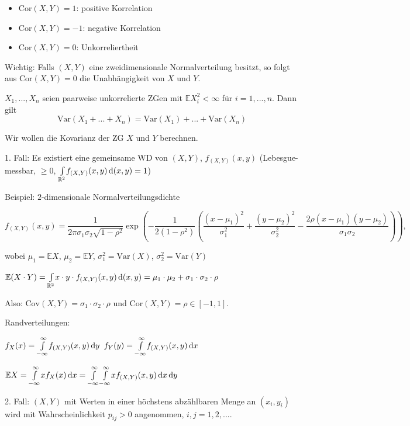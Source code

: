 \documentclass{cheat-sheet}
\newcommand{\E}{\mathbb{E}} %
\newcommand{\Var}{\mathrm{Var}} %
\newcommand{\Cov}{\mathrm{Cov}} %
\newcommand{\cor}{\mathrm{Cor}} %
\begin{document}
\begin{bem}
  \begin{itemize}
    \item $\cor(X, Y) = 1$: positive Korrelation
    \item $\cor(X, Y) = -1$: negative Korrelation
    \item $\cor(X, Y) = 0$: Unkorreliertheit
  \end{itemize}
\end{bem}

Wichtig: Falls $(X, Y)$ eine zweidimensionale Normalverteilung besitzt, so folgt aus $\cor(X, Y) = 0$ die Unabhängigkeit von $X$ und $Y$.

\begin{satz}
  $X_1, ..., X_n$ seien paarweise unkorrelierte ZGen mit $\E X_i^2 < \infty$ für $i = 1, ..., n$. Dann gilt
  \[ \Var(X_1 + ... + X_n) = \Var(X_1) + ... + \Var(X_n) \]
\end{satz}



Wir wollen die Kovarianz der ZG $X$ und $Y$ berechnen.

1. Fall: Es existiert eine gemeinsame WD von $(X, Y)$, $f_{(X, Y)}(x, y)$ (Lebesgue-messbar, $\geq 0$, ${\textstyle \int\limits_{\mathbb{R}^2}^{}} f_{(X,Y)}(x,y) \,\mathrm{d} (x, y) = 1$)

Beispiel: $2$-dimensionale Normalverteilungsdichte

\[ f_{(X,Y)}(x,y) = \frac{1}{2 \pi \sigma_1 \sigma_2 \sqrt{1 - \rho^2}} \exp \left( - \frac{1}{2 (1 - \rho^2)} \left( \frac{(x-\mu_1)^2}{\sigma_1^2} + \frac{(y-\mu_2)^2}{\sigma_2^2} - \frac{2 \rho (x-\mu_1)(y-\mu_2)}{\sigma_1 \sigma_2} \right) \right), \]

wobei $\mu_1 = \E X$, $\mu_2 = \E Y$, $\sigma_1^2 = \Var(X)$, $\sigma_2^2 = \Var(Y)$

$\E (X \cdot Y) = \Int{\R^2}{}{x \cdot y \cdot f_{(X,Y)}(x,y)}{(x, y)} = \mu_1 \cdot \mu_2 + \sigma_1 \cdot \sigma_2 \cdot \rho$

Also: $\Cov(X, Y) = \sigma_1 \cdot \sigma_2 \cdot \rho$ und $\cor(X, Y) = \rho \in [-1, 1]$.

Randverteilungen:

$f_X(x) = {\textstyle \int\limits_{-\infty}^{\infty}} f_{(X,Y)}(x,y) \,\mathrm{d} y$
$f_Y(y) = {\textstyle \int\limits_{-\infty}^{\infty}} f_{(X,Y)}(x,y) \,\mathrm{d} x$

$\E X = \Int{-\infty}{\infty}{x f_X(x)}{x} = \Int{-\infty}{\infty}{\Int{-\infty}{\infty}{x f_{(X,Y)}(x,y)}{x}}{y}$

2. Fall: $(X, Y)$ mit Werten in einer höchstens abzählbaren Menge an $(x_i, y_i)$ wird mit Wahrscheinlichkeit $p_{ij} > 0$ angenommen, $i, j = 1, 2, ...$.
\end{document}
